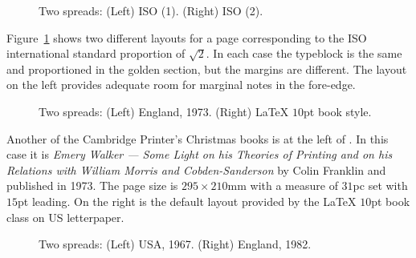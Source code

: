 \documentclass[10pt,letterpaper]{memoir}
\newlength{\pwlayi}\setlength{\pwlayi}{0.45\textwidth} %
\newlength{\pwlayii}\setlength{\pwlayii}{0.45\pwlayi}
\begin{document}
\begin{figure}
\centering
\begin{minipage}[b]{\pwlayi}
\end{minipage}
\hfill
\begin{minipage}[b]{\pwlayi}
\end{minipage}
\caption[Two spreads for ISO page sizes]%
        {Two spreads: (Left) ISO (1).
         (Right) ISO (2).} \label{fb:12}
\end{figure}

    Figure~\ref{fb:12} shows two different layouts for a page corresponding
to the ISO international standard proportion of $\sqrt{2}$. In each case
the typeblock is the same and proportioned in the 
golden section, 
but the margins are different. The layout on the left provides adequate
room for marginal notes in the fore-edge.


\begin{figure}
\centering
\begin{minipage}[b]{\pwlayi}
\end{minipage}
\hfill
\begin{minipage}[b]{\pwlayi}
\end{minipage}
\caption[Two spreads: England, 1973 and LaTeX $10pt$ book style]%
        {Two spreads: (Left) England, 1973.
         (Right) LaTeX $10$pt book style.} \label{fb:13}
\end{figure}

    Another of the Cambridge Printer's Christmas books is at the left
of . In this case it is \textit{Emery Walker --- Some Light
on his Theories of Printing and on his Relations with William Morris
and Cobden-Sanderson} by Colin Franklin and published in 1973. The
page size is $295 \times 210$mm with a measure of $31$pc set with
$15$pt leading. On the right is the default layout provided by the
LaTeX $10$pt book class on US letterpaper.

\begin{figure}
\centering
\begin{minipage}[b]{\pwlayi}
\end{minipage}
\hfill
\begin{minipage}[b]{\pwlayi}
\end{minipage}
\caption[Two spreads: USA, 1967 and England, 1982]%
        {Two spreads: (Left) USA, 1967.
         (Right) England, 1982.} \label{fb:14}
\end{figure}
\end{document}
